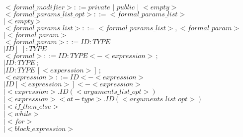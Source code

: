 \documentclass[11pt]{article}
\begin{document}
\begin{enumerate}
$<formal\_modifier>             ::= private \,\,|\,\, public \,\,|\,\, <empty>$\\
\color{black}
$<formal\_params\_list\_opt>  ::= <formal\_params\_list>$\\
                          \hspace*{5.2cm}$|   <empty>$\\

$<formal\_params\_list>      ::= <formal\_params\_list> , <formal\_param>$\\
                          \hspace*{4.5cm}$|   <formal\_param>$\\

$<formal\_param>            ::= ID : TYPE $\\
\color{blue}
                                \hspace*{3.8cm}$| ID[\,\,] : TYPE$\\
\color{black}
$<formal>                  ::= ID : TYPE <- <expression>\,;$\\
                          \hspace*{2.5cm}$|   ID : TYPE\,;$\\
            \color{blue}
            \hspace*{2.5cm}$|   ID : TYPE\,[<experssion>]\,;$\\
    \color{black}
$<expression>              ::= ID <- <expression> $\\
                    \color{blue}
                           \hspace*{3.2cm}$| ID[<expression>] <- <expression>$\\
                    \color{black}
                          \hspace*{3.2cm}$|   <expression>.ID( <arguments\_list\_opt> )$\\
                          \hspace*{3.2cm}$|   <expression><at-type>.ID( <arguments\_list\_opt> )$\\
                          \hspace*{3.2cm}$|   <if\_then\_else>$\\
                          \hspace*{3.2cm}$|   <while> $\\
                          \color{blue}
                          \hspace*{3.2cm}$|   <for>$\\
                          \color{black}
                          \hspace*{3.2cm}$|   <block\_expression>$\\

\end{enumerate}
\end{document}
